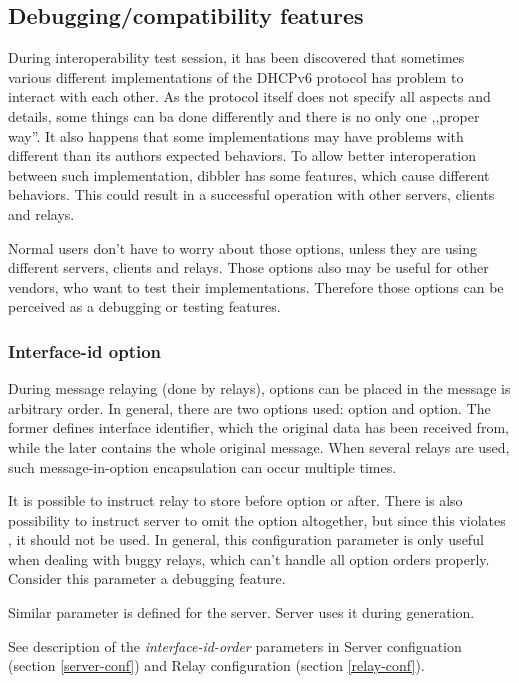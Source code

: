 \subsection{Debugging/compatibility features}
During interoperability test session, it has been discovered that
sometimes various different implementations of the DHCPv6 protocol has
problem to interact with each other. As the protocol itself does not
specify all aspects and details, some things can ba done differently
and there is no only one ,,proper way''. It also happens that some
implementations may have problems with different than its authors
expected behaviors. To allow better interoperation between such
implementation, dibbler has some features, which cause different
behaviors. This could result in a successful operation with other
servers, clients and relays.

Normal users don't have to worry about those options, unless they are
using different servers, clients and relays. Those options also may be
useful for other vendors, who want to test their
implementations. Therefore those options can be perceived as a
debugging or testing features.

\subsubsection{Interface-id option}

During message relaying (done by relays), options can be placed in the 
message is arbitrary order. In general, there are two options used:
 option and  option. The former
defines interface identifier, which the original data has been
received from, while the later contains the whole original
message. When several relays are used, such message-in-option
encapsulation can occur multiple times.

It is possible to instruct relay to store  before
 option or after. There is also possibility to instruct
server to omit the  option altogether, but since 
this violates \cite{rfc3315}, it should not be used. In general, this
configuration parameter is only useful when dealing with buggy relays,
which can't handle all option orders properly. Consider this parameter
a debugging feature.

Similar parameter is defined for the server. Server uses it during
 generation. 

See description of the \emph{interface-id-order} parameters in Server
configuation (section \ref{server-conf}) and Relay configuration
(section \ref{relay-conf}).

